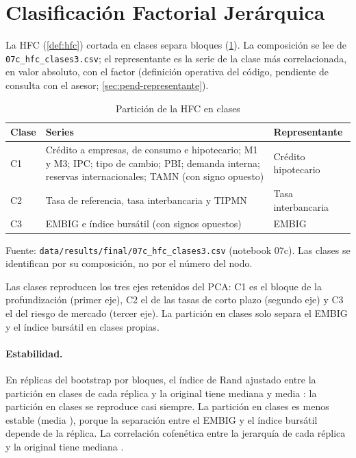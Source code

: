 \section{Clasificación Factorial Jerárquica}
\label{sec:res-hfc}

La HFC (\cref{def:hfc}) cortada en \clasesHfcMenor{} clases separa \clasesHfcMenor{} bloques
(\cref{tab:res-hfc}). La composición se lee de \texttt{07c\_hfc\_clases3.csv}; el representante es
la serie de la clase más correlacionada, en valor absoluto, con el factor (definición operativa del
código, pendiente de consulta con el asesor; \cref{sec:pend-representante}).

\begin{table}[htbp]
\centering
\small
\caption{Partición de la HFC en \clasesHfcMenor{} clases}
\label{tab:res-hfc}
\begin{tabular}{@{}l>{\raggedright\arraybackslash}p{}>{\raggedright\arraybackslash}p{}@{}}
\toprule
Clase & Series & Representante \\
\midrule
C1 & Crédito a empresas, de consumo e hipotecario; M1 y M3; IPC; tipo de cambio; PBI; demanda
  interna; reservas internacionales; TAMN (con signo opuesto) & Crédito hipotecario \\
C2 & Tasa de referencia, tasa interbancaria y TIPMN & Tasa interbancaria \\
C3 & EMBIG e índice bursátil (con signos opuestos) & EMBIG \\
\bottomrule
\end{tabular}

\smallskip
\begin{minipage}{0.92\textwidth}\footnotesize
Fuente: \texttt{data/results/final/07c\_hfc\_clases3.csv} (notebook 07c). Las clases se identifican
por su composición, no por el número del nodo.
\end{minipage}
\end{table}

Las \clasesHfcMenor{} clases reproducen los tres ejes retenidos del PCA: C1 es el bloque de la profundización (primer
eje), C2 el de las tasas de corto plazo (segundo eje) y C3 el del riesgo de mercado (tercer eje). La
partición en \clasesHfcMayor{} clases solo separa el EMBIG y el índice bursátil en clases propias.

\paragraph{Estabilidad.} En \replicasHfc{} réplicas del bootstrap por bloques, el índice de Rand
ajustado entre la partición en \clasesHfcMenor{} clases de cada réplica y la original tiene mediana
\ariTresMediana{} y media \ariTresMedia{}: la partición en \clasesHfcMenor{} clases se reproduce casi siempre.
La partición en \clasesHfcMayor{} clases es menos estable (media \ariCuatroMedia{}), porque la separación
entre el EMBIG y el índice bursátil depende de la réplica. La correlación cofenética entre la
jerarquía de cada réplica y la original tiene mediana \cofeneticaMediana{}.

